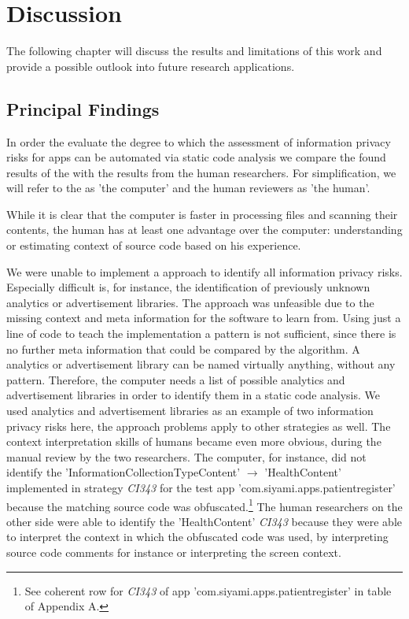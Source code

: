 \section{Discussion}

The following chapter will discuss the results and limitations of this work and provide a possible outlook into future research applications.

\subsection{Principal Findings}

In order the evaluate the degree to which the assessment of information privacy risks for \mH apps can be automated via static code analysis we compare the \ipr found results of the \aiprat with the results from the human researchers.
For simplification, we will refer to the \aiprat as 'the computer' and the human reviewers as 'the human'.

While it is clear that the computer is faster in processing files and scanning their contents, the human has at least one advantage over the computer: understanding or estimating context of source code based on his experience.

We were unable to implement a \ml approach to identify all information privacy risks.
Especially difficult is, for instance, the identification of previously unknown analytics or advertisement libraries.
The \ml approach was unfeasible due to the missing context and meta information for the software to learn from.
Using just a line of code to teach the \ml implementation a pattern is not sufficient, since there is no further meta information that could be compared by the algorithm.
A analytics or advertisement library can be named virtually anything, without any pattern.
Therefore, the computer needs a list of possible analytics and advertisement libraries in order to identify them in a static code analysis.
We used analytics and advertisement libraries as an example of two information privacy risks here, the \ml approach problems apply to other \ipr strategies as well.
The context interpretation skills of humans became even more obvious, during the manual review by the two researchers.
The computer, for instance, did not identify the \ipr 'InformationCollectionTypeContent' $\rightarrow$ 'HealthContent' implemented in strategy \textit{CI343} for the test app 'com.siyami.apps.patientregister' because the matching source code was obfuscated.\footnote{See coherent row for \textit{CI343} of app 'com.siyami.apps.patientregister'  in table of Appendix A.}
The human researchers on the other side were able to identify the 'HealthContent' \textit{CI343} \ipr because they were able to interpret the context in which the obfuscated code was used, by interpreting source code comments for instance or interpreting the screen context.


